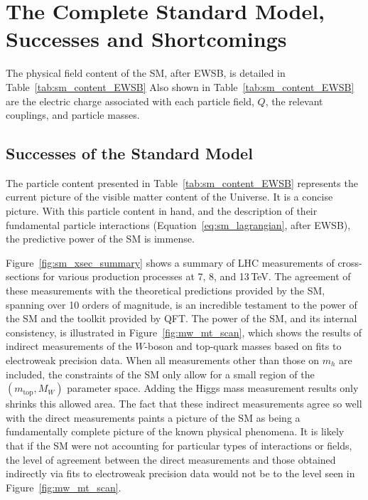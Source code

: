 \section{The Complete Standard Model, Successes and Shortcomings}
\label{sec:final_sm_description}

The physical field content of the SM, after EWSB, is detailed in Table~\ref{tab:sm_content_EWSB}
Also shown in Table~\ref{tab:sm_content_EWSB} are the electric charge associated with each
particle field, $Q$, the relevant couplings, and particle masses.



%
%

\subsection{Successes of the Standard Model}
\label{sec:sm_successes}

The particle content presented in Table~\ref{tab:sm_content_EWSB} represents the current
picture of the visible matter content of the Universe.
It is a concise picture.
With this particle content in hand, and the description of their fundamental particle interactions (Equation~\ref{eq:sm_lagrangian}, after EWSB),
the predictive power of the SM is immense.

Figure~\ref{fig:sm_xsec_summary} shows a summary of LHC measurements of cross-sections
for various production processes at 7, 8, and 13\,TeV.
The agreement of these measurements with the theoretical predictions provided by the SM, spanning over 10 orders of magnitude,
is an incredible testament to the power of the SM and the toolkit provided by QFT.
The power of the SM, and its internal consistency, is illustrated in Figure~\ref{fig:mw_mt_scan},
which shows the results of indirect measurements of the $W$-boson and top-quark masses based
on fits to electroweak precision data.
When all measurements other than those on $m_h$ are included, the constraints of the SM
only allow for a small region of the $(m_{\text{top}}, M_W)$ parameter space.
Adding the Higgs mass measurement results only shrinks this allowed area.
The fact that these indirect measurements agree so well with the direct measurements paints a picture
of the SM as being a fundamentally complete picture of the known physical phenomena.
It is likely that if the SM were not accounting for particular types of interactions or fields,
the level of agreement between the direct measurements and those obtained indirectly via
fits to electroweak precision data would not be to the level seen in Figure~\ref{fig:mw_mt_scan}.

